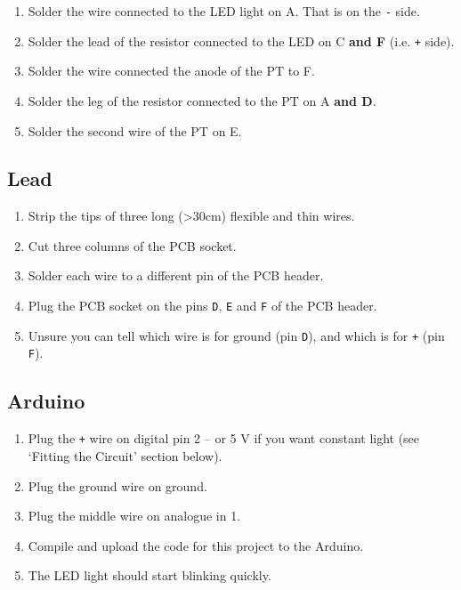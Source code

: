 \documentclass[]{article}
\begin{document}
\begin{enumerate}
\def\labelenumi{\arabic{enumi}.}
\setcounter{enumi}{1}
\itemsep1pt\parskip0pt
\item
  Solder the wire connected to the LED light on A. That is on the
  \texttt{-} side.
\item
  Solder the lead of the resistor connected to the LED on C \textbf{and
  F} (i.e. \texttt{+} side).
\item
  Solder the wire connected the anode of the PT to F.
\item
  Solder the leg of the resistor connected to the PT on A \textbf{and
  D}.
\item
  Solder the second wire of the PT on E.
\end{enumerate}

\subsection{Lead}\label{lead}

\begin{enumerate}
\def\labelenumi{\arabic{enumi}.}
\itemsep1pt\parskip0pt
\item
  Strip the tips of three long (\textgreater{}30cm) flexible and thin
  wires.
\item
  Cut three columns of the PCB socket.
\item
  Solder each wire to a different pin of the PCB header.
\item
  Plug the PCB socket on the pins \texttt{D}, \texttt{E} and \texttt{F}
  of the PCB header.
\item
  Unsure you can tell which wire is for ground (pin \texttt{D}), and
  which is for \texttt{+} (pin \texttt{F}).
\end{enumerate}

\subsection{Arduino}\label{arduino}

\begin{enumerate}
\def\labelenumi{\arabic{enumi}.}
\itemsep1pt\parskip0pt
\item
  Plug the \texttt{+} wire on digital pin 2 -- or 5 V if you want
  constant light (see `Fitting the Circuit' section below).
\item
  Plug the ground wire on ground.
\item
  Plug the middle wire on analogue in 1.
\item
  Compile and upload the code for this project to the Arduino.
\item
  The LED light should start blinking quickly.
\end{enumerate}
\end{document}
